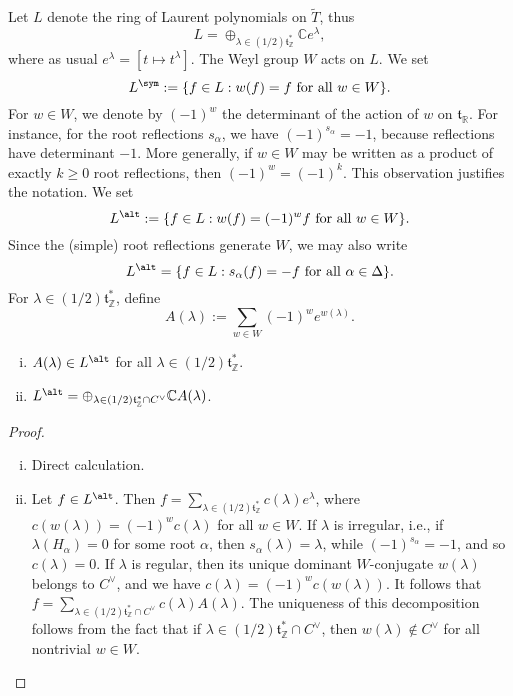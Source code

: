 \documentclass[reqno]{amsart} 
\begin{document}
Let $L$ denote the ring of Laurent polynomials on $\tilde{T}$, thus
\begin{equation*}
  L = \oplus_{\lambda \in (1/2) \mathfrak{t}_{\mathbb{Z}}^*} \mathbb{C} e^{\lambda},
\end{equation*}
where as usual $e^\lambda = [t \mapsto t^{\lambda}]$.  The Weyl group $W$ acts on $L$.  We set
\begin{equation*}
  L^{\sym} := \{f \in L : w(f) = f \text{ for all } w \in W\}.
\end{equation*}
For $w \in W$, we denote by $(-1)^w$ the determinant of the action of $w$ on $\mathfrak{t}_{\mathbb{R}}$.  For instance, for the root reflections $s_\alpha$, we have $(-1)^{s_\alpha} = -1$, because reflections have determinant $-1$.  More generally, if $w \in W$ may be written as a product of exactly $k \geq 0$ root reflections, then $(-1)^w = (-1)^k$.  This observation justifies the notation.  We set
\begin{equation*}
  L^{\alt} := \{f \in L : w(f) = (-1)^w f \text{ for all } w \in W\}.
\end{equation*}
Since the (simple) root reflections generate $W$, we may also write
\begin{equation*}
  L^{\alt} = \{f \in L : s_\alpha(f) = - f \text{ for all } \alpha \in \Delta\}.
\end{equation*}
For $\lambda \in (1/2) \mathfrak{t}_{\mathbb{Z}}^*$, define
\begin{equation}\label{eq:}
  A(\lambda)
  :=
  \sum_{w \in W}
  (-1)^w
  e^{w(\lambda)}.
\end{equation}
\begin{lemma}
  \begin{enumerate}
[(i)]
  \item $A(\lambda) \in L^{\alt}$ for all $\lambda \in (1/2) \mathfrak{t}_{\mathbb{Z}}^*$.
  \item $L^{\alt} = \oplus_{\lambda \in (1/2) \mathfrak{t}_{\mathbb{Z}}^* \cap C^\vee} \mathbb{C} A(\lambda)$.
  \end{enumerate}
\end{lemma}
\begin{proof}
  \begin{enumerate}
[(i)]
  \item Direct calculation.
  \item Let $f \in L^{\alt}$.  Then $f = \sum_{\lambda \in (1/2) \mathfrak{t}_{\mathbb{Z}}^*} c(\lambda) e^{\lambda}$, where $c(w(\lambda)) = (-1)^w c(\lambda)$ for all $w \in W$.  If $\lambda$ is irregular, i.e., if $\lambda(H_\alpha) = 0$ for some root $\alpha$, then $s_\alpha(\lambda) = \lambda$, while $(-1)^{s_\alpha} = -1$, and so $c(\lambda) = 0$.  If $\lambda$ is regular, then its unique dominant $W$-conjugate $w(\lambda)$ belongs to $C^\vee$, and we have $c(\lambda) = (-1)^w c(w(\lambda))$.  It follows that $f = \sum_{\lambda \in (1/2) \mathfrak{t}_{\mathbb{Z}}^* \cap C^\vee} c(\lambda) A(\lambda)$.  The uniqueness of this decomposition follows from the fact that if $\lambda \in (1/2) \mathfrak{t}_{\mathbb{Z}}^* \cap C^\vee$, then $w(\lambda) \notin C^\vee$ for all nontrivial $w \in W$.
  \end{enumerate}
\end{proof}
\end{document}
